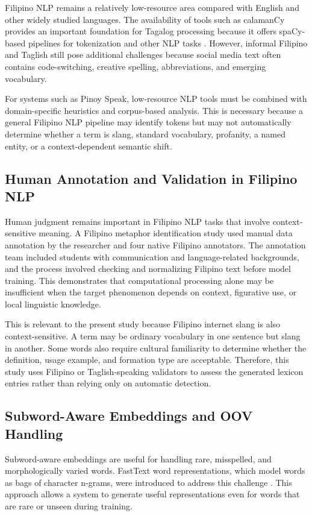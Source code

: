 Filipino NLP remains a relatively low-resource area compared
with English and other widely studied languages. The
availability of tools such as calamanCy provides an important
foundation for Tagalog processing because it offers
spaCy-based pipelines for tokenization and other NLP tasks
\cite{b6}. However, informal Filipino and Taglish still pose
additional challenges because social media text often contains
code-switching, creative spelling, abbreviations, and emerging
vocabulary.

For systems such as Pinoy Speak, low-resource NLP tools must
be combined with domain-specific heuristics and corpus-based
analysis. This is necessary because a general Filipino NLP
pipeline may identify tokens but may not automatically
determine whether a term is slang, standard vocabulary,
profanity, a named entity, or a context-dependent semantic
shift.

\subsection{Human Annotation and Validation in Filipino NLP}

Human judgment remains important in Filipino NLP tasks that
involve context-sensitive meaning. A Filipino metaphor
identification study \cite{b12} used manual data annotation
by the researcher and four native Filipino annotators. The
annotation team included students with communication and
language-related backgrounds, and the process involved
checking and normalizing Filipino text before model training.
This demonstrates that computational processing alone may be
insufficient when the target phenomenon depends on context,
figurative use, or local linguistic knowledge.

This is relevant to the present study because Filipino internet
slang is also context-sensitive. A term may be ordinary
vocabulary in one sentence but slang in another. Some words
also require cultural familiarity to determine whether the
definition, usage example, and formation type are acceptable.
Therefore, this study uses Filipino or Taglish-speaking
validators to assess the generated lexicon entries rather than
relying only on automatic detection.

\subsection{Subword-Aware Embeddings and OOV Handling}

Subword-aware embeddings are useful for handling rare,
misspelled, and morphologically varied words. FastText word
representations, which model words as bags of character
n-grams, were introduced to address this challenge \cite{b5}.
This approach allows a system to generate useful
representations even for words that are rare or unseen during
training.

